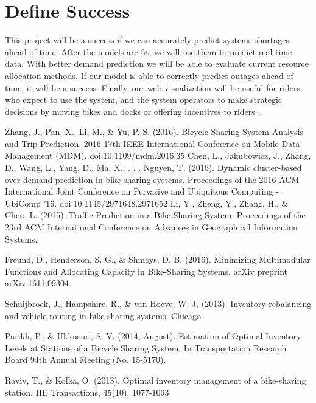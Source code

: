 \documentclass{proc}
\begin{document}
\section{Define Success}


This project will be a success if we can accurately predict systems shortages ahead of time. After the models are fit, we will use them to predict real-time data. With better demand prediction we will be able to evaluate current resource allocation methods. If our model is able to correctly predict outages ahead of time, it will be a success.  Finally, our web visualization will be useful for riders who expect to use the system, and the system operators to make strategic decisions by moving bikes and docks or offering incentives to riders
.

\begin{thebibliography}{2}
  Zhang, J., Pan, X., Li, M., \& Yu, P. S. (2016). Bicycle-Sharing System Analysis and Trip Prediction. 2016 17th IEEE International Conference on Mobile Data Management (MDM). doi:10.1109/mdm.2016.35
Chen, L., Jakubowicz, J., Zhang, D., Wang, L., Yang, D., Ma, X., . . . Nguyen, T. (2016). Dynamic cluster-based over-demand prediction in bike sharing systems. Proceedings of the 2016 ACM International Joint Conference on Pervasive and Ubiquitous Computing - UbiComp '16. doi:10.1145/2971648.2971652
 Li, Y., Zheng, Y., Zhang, H., \& Chen, L. (2015). Traffic Prediction in a Bike-Sharing System. Proceedings of the 23rd ACM International Conference on Advances in Geographical Information Systems.

 Freund, D., Henderson, S. G., \& Shmoys, D. B. (2016). Minimizing Multimodular Functions and Allocating Capacity in Bike-Sharing Systems. arXiv preprint arXiv:1611.09304.

Schuijbroek, J., Hampshire, R., \& van Hoeve, W. J. (2013). Inventory rebalancing and vehicle routing in bike sharing systems.
Chicago	

 Parikh, P., \& Ukkusuri, S. V. (2014, August). Estimation of Optimal Inventory Levels at Stations of a Bicycle Sharing System. In Transportation Research Board 94th Annual Meeting (No. 15-5170).

 Raviv, T., \& Kolka, O. (2013). Optimal inventory management of a bike-sharing station. IIE Transactions, 45(10), 1077-1093.


\end{thebibliography}


\end{document}
